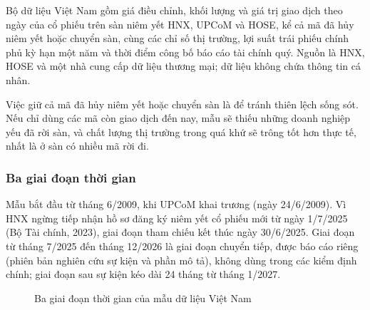 Bộ dữ liệu Việt Nam gồm giá điều chỉnh, khối lượng và giá trị giao dịch theo ngày của cổ phiếu trên sàn niêm yết HNX, UPCoM và HOSE, kể cả mã đã hủy niêm yết hoặc chuyển sàn, cùng các chỉ số thị trường, lợi suất trái phiếu chính phủ kỳ hạn một năm và thời điểm công bố báo cáo tài chính quý. Nguồn là HNX, HOSE và một nhà cung cấp dữ liệu thương mại; dữ liệu không chứa thông tin cá nhân.

Việc giữ cả mã đã hủy niêm yết hoặc chuyển sàn là để tránh thiên lệch sống sót. Nếu chỉ dùng các mã còn giao dịch đến nay, mẫu sẽ thiếu những doanh nghiệp yếu đã rời sàn, và chất lượng thị trường trong quá khứ sẽ trông tốt hơn thực tế, nhất là ở sàn có nhiều mã rời đi.

\subsubsection*{Ba giai đoạn thời gian}

Mẫu bắt đầu từ tháng 6/2009, khi UPCoM khai trương (ngày 24/6/2009). Vì HNX ngừng tiếp nhận hồ sơ đăng ký niêm yết cổ phiếu mới từ ngày 1/7/2025 (Bộ Tài chính, 2023), giai đoạn tham chiếu kết thúc ngày 30/6/2025. Giai đoạn từ tháng 7/2025 đến tháng 12/2026 là giai đoạn chuyển tiếp, được báo cáo riêng (phiên bản nghiên cứu sự kiện và phần mô tả), không dùng trong các kiểm định chính; giai đoạn sau sự kiện kéo dài 24 tháng từ tháng 1/2027.

\begin{figure}[H]
\myfloatalign
{}
\caption{Ba giai đoạn thời gian của mẫu dữ liệu Việt Nam}\label{fig:giaidoan}
\end{figure}


